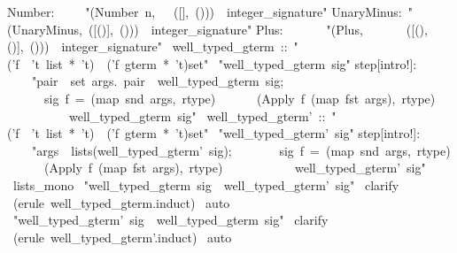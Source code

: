 \begin{isabelle}
Number:\ \ \ \ \ "(Number\ n,\ \ \ ([],\ ()))\ \isasymin \ integer_signature"\isanewline
UnaryMinus:\ "(UnaryMinus,\ ([()],\ ()))\ \isasymin \ integer_signature"\isanewline
Plus:\ \ \ \ \ \ \ "(Plus,\ \ \ \ \ \ \ ([(),()],\ ()))\ \isasymin \ integer_signature"\isanewline
\isanewline
\isanewline
{}\ well_typed_gterm\ ::\ "('f\ \isasymRightarrow \ 't\ list\ *\ 't)\ \isasymRightarrow \ ('f\ gterm\ *\ 't)set"\isanewline
{}\ "well_typed_gterm\ sig"\isanewline
{}\isanewline
step[intro!]:\ \isanewline
\ \ \ \ "\isasymlbrakk \isasymforall pair\ \isasymin \ set\ args.\ pair\ \isasymin \ well_typed_gterm\ sig;\ \isanewline
\ \ \ \ \ \ sig\ f\ =\ (map\ snd\ args,\ rtype)\isasymrbrakk \isanewline
\ \ \ \ \ \isasymLongrightarrow \ (Apply\ f\ (map\ fst\ args),\ rtype)\ \isanewline
\ \ \ \ \ \ \ \ \ \isasymin \ well_typed_gterm\ sig"\isanewline
\isanewline
{}\ well_typed_gterm'\ ::\ "('f\ \isasymRightarrow \ 't\ list\ *\ 't)\ \isasymRightarrow \ ('f\ gterm\ *\ 't)set"\isanewline
{}\ "well_typed_gterm'\ sig"\isanewline
{}\isanewline
step[intro!]:\ \isanewline
\ \ \ \ "\isasymlbrakk args\ \isasymin \ lists(well_typed_gterm'\ sig);\ \isanewline
\ \ \ \ \ \ sig\ f\ =\ (map\ snd\ args,\ rtype)\isasymrbrakk \isanewline
\ \ \ \ \ \isasymLongrightarrow \ (Apply\ f\ (map\ fst\ args),\ rtype)\ \isanewline
\ \ \ \ \ \ \ \ \ \isasymin \ well_typed_gterm'\ sig"\isanewline
{}\ lists_mono\isanewline
\isanewline
\isanewline
{}\ "well_typed_gterm\ sig\ \isasymsubseteq \ well_typed_gterm'\ sig"\isanewline
{}\ clarify\isanewline
{}\ (erule\ well_typed_gterm.induct)\isanewline
{}\ auto\isanewline
{}\isanewline
\isanewline
{}\ "well_typed_gterm'\ sig\ \isasymsubseteq \ well_typed_gterm\ sig"\isanewline
{}\ clarify\isanewline
{}\ (erule\ well_typed_gterm'.induct)\isanewline
{}\ auto\isanewline
{}\isanewline
\isanewline
\isanewline
{}\isanewline
\isanewline
\end{isabelle}
